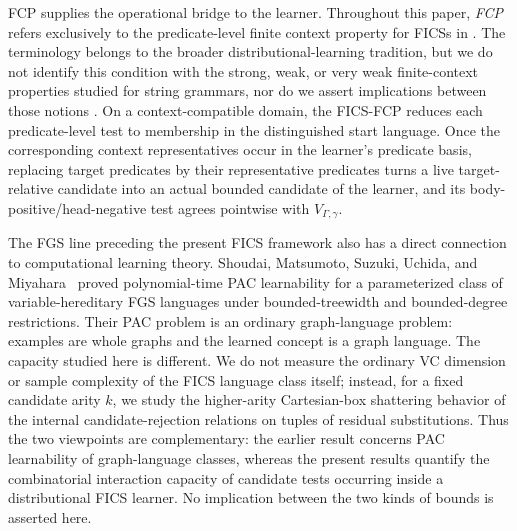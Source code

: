 \documentclass[11pt]{article}
\theoremstyle{definition}
\theoremstyle{remark}
\begin{document}
FCP supplies the operational bridge to the learner.  Throughout this paper,
\emph{FCP} refers exclusively to the predicate-level finite context property
for FICSs in \cite{ShoudaiEtAl2026}.  The terminology belongs to the broader
distributional-learning tradition, but we do not identify this condition with
the strong, weak, or very weak finite-context properties studied for string
grammars, nor do we assert implications between those notions
\cite{KanazawaYoshinaka2017}.  On a context-compatible domain, the FICS-FCP
reduces each predicate-level test to membership in the distinguished start
language.  Once the corresponding context representatives occur in the
learner's predicate basis, replacing target predicates by their representative
predicates turns a live target-relative candidate into an actual bounded
candidate of the learner, and its body-positive/head-negative test agrees
pointwise with \(V_{\Gamma,\gamma}\).

The FGS line preceding the present FICS framework also has a direct connection
to computational learning theory.  Shoudai, Matsumoto, Suzuki, Uchida, and
Miyahara~\cite{ShoudaiEtAl2023PACFGS} proved polynomial-time PAC learnability
for a parameterized class of variable-hereditary FGS languages under
bounded-treewidth and bounded-degree restrictions.  Their PAC problem is an ordinary graph-language
problem: examples are whole graphs and the learned concept is a graph
language.  The capacity studied here is different.  We do not measure the
ordinary VC dimension or sample complexity of the FICS language class itself;
instead, for a fixed candidate arity \(k\), we study the higher-arity
Cartesian-box shattering behavior of the internal candidate-rejection
relations on tuples of residual substitutions.  Thus the two viewpoints are
complementary: the earlier result concerns PAC learnability of graph-language
classes, whereas the present results quantify the combinatorial interaction
capacity of candidate tests occurring inside a distributional FICS learner.
No implication between the two kinds of bounds is asserted here.
\end{document}
